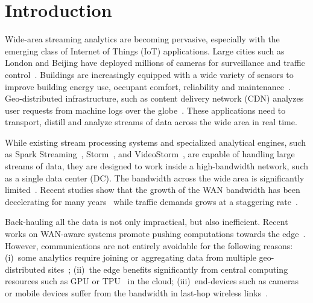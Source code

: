 \section{Introduction}

Wide-area streaming analytics are becoming pervasive, especially with the
emerging class of Internet of Things (IoT) applications.  Large cities such as
London and Beijing have deployed millions of cameras for surveillance and
traffic control~\cite{london.surveillance, skynet}. Buildings are increasingly
equipped with a wide variety of sensors to improve building energy use, occupant
comfort, reliability and
maintenance~\cite{krioukov2012building}. Geo-distributed infrastructure, such as
content delivery network (CDN) analyzes user requests from machine logs over the
globe~\cite{mukerjee2015practical}. These applications need to transport,
distill and analyze streams of data across the wide area in real time.

While existing stream processing systems and specialized analytical engines,
such as Spark Streaming~\cite{zaharia2013discretized},
Storm~\cite{toshniwal2014storm}, and VideoStorm~\cite{zhang2017live}, are
capable of handling large streams of data, they are designed to work inside a
high-bandwidth network, such as a single data center (DC). The bandwidth across
the wide area is significantly limited~\cite{hsieh17gaia,
  vulimiri2015global}. Recent studies show that the growth of the WAN bandwidth
has been decelerating for many years~\cite{global2016telegeography} while
traffic demands grows at a staggering rate~\cite{index2013zettabyte}.

Back-hauling all the data is not only impractical, but also inefficient. Recent
works on WAN-aware systems promote pushing computations towards the
edge~\cite{satyanarayanan2009case, rabkin2014aggregation, pu2015low}. However,
communications are not entirely avoidable for the following reasons: (i)~some
analytics require joining or aggregating data from multiple geo-distributed
sites~\cite{pu2015low, viswanathan2016clarinet}; (ii)~the edge benefits
significantly from central computing resources such as GPU or
TPU~\cite{abadi2016tensorflow} in the cloud; (iii)~end-devices such as cameras
or mobile devices suffer from the bandwidth in last-hop wireless
links~\cite{zhang2015design, abari2017enabling}.


